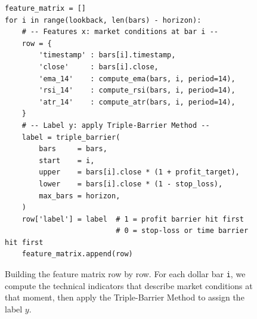 %
%

\begin{figure}[ht]
\centering
\begin{verbatim}
feature_matrix = []
for i in range(lookback, len(bars) - horizon):
    # -- Features x: market conditions at bar i --
    row = {
        'timestamp' : bars[i].timestamp,
        'close'     : bars[i].close,
        'ema_14'    : compute_ema(bars, i, period=14),
        'rsi_14'    : compute_rsi(bars, i, period=14),
        'atr_14'    : compute_atr(bars, i, period=14),
    }
    # -- Label y: apply Triple-Barrier Method --
    label = triple_barrier(
        bars     = bars,
        start    = i,
        upper    = bars[i].close * (1 + profit_target),
        lower    = bars[i].close * (1 - stop_loss),
        max_bars = horizon,
    )
    row['label'] = label  # 1 = profit barrier hit first
                          # 0 = stop-loss or time barrier hit first
    feature_matrix.append(row)
\end{verbatim}
\caption{Building the feature matrix row by row. For each dollar bar
  \texttt{i}, we compute the technical indicators that describe market
  conditions at that moment, then apply the Triple-Barrier Method to
  assign the label $y$.}
\label{lst:feature-matrix-loop}
\end{figure}